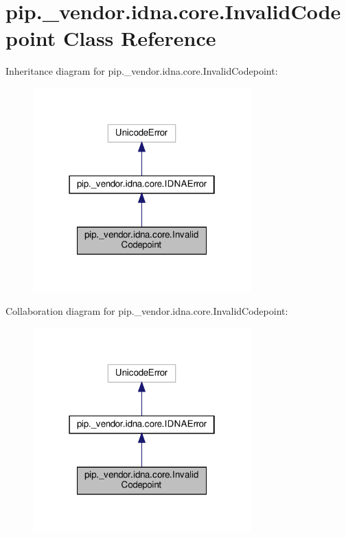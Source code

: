 \hypertarget{classpip_1_1__vendor_1_1idna_1_1core_1_1InvalidCodepoint}{}\section{pip.\+\_\+vendor.\+idna.\+core.\+Invalid\+Codepoint Class Reference}
\label{classpip_1_1__vendor_1_1idna_1_1core_1_1InvalidCodepoint}


Inheritance diagram for pip.\+\_\+vendor.\+idna.\+core.\+Invalid\+Codepoint\+:
\nopagebreak
\begin{figure}[H]
\begin{center}
\leavevmode
\includegraphics[width=238pt]{classpip_1_1__vendor_1_1idna_1_1core_1_1InvalidCodepoint__inherit__graph}
\end{center}
\end{figure}


Collaboration diagram for pip.\+\_\+vendor.\+idna.\+core.\+Invalid\+Codepoint\+:
\nopagebreak
\begin{figure}[H]
\begin{center}
\leavevmode
\includegraphics[width=238pt]{classpip_1_1__vendor_1_1idna_1_1core_1_1InvalidCodepoint__coll__graph}
\end{center}
\end{figure}


